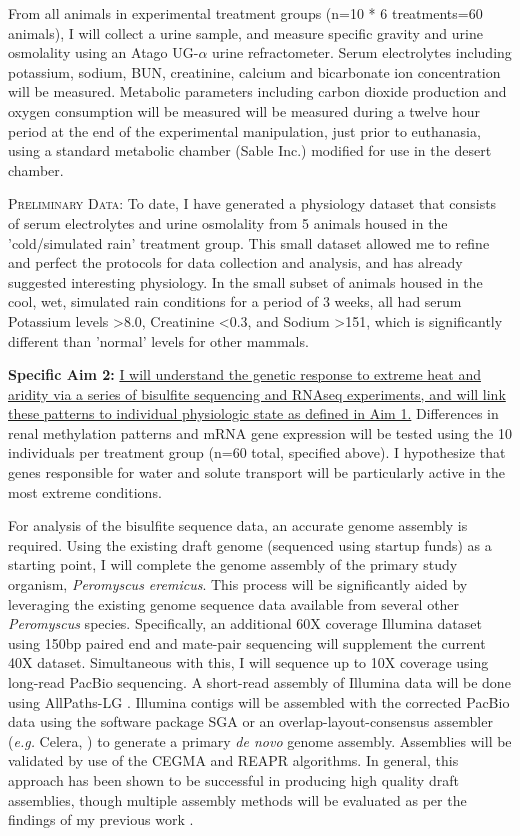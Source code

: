 \documentclass[11pt]{article}
\begin{document}
From all animals in experimental treatment groups (n=10 * 6 treatments=60 animals), I will collect a urine sample, and measure specific gravity and urine osmolality using an Atago UG-$\alpha$ urine refractometer. Serum electrolytes including potassium, sodium, BUN, creatinine, calcium and bicarbonate ion concentration will be measured. Metabolic parameters including carbon dioxide production and oxygen consumption will be measured will be measured during a twelve hour period at the end of the experimental manipulation, just prior to euthanasia, using a standard metabolic chamber (Sable Inc.) modified for use in the desert chamber. 

\textsc{{Preliminary Data:}} To date, I have generated a physiology dataset that consists of serum electrolytes and urine osmolality from 5 animals housed in the 'cold/simulated rain' treatment group. This small dataset allowed me to refine and perfect the protocols for data collection and analysis, and has already suggested interesting physiology. In the small subset of animals housed in the cool, wet, simulated rain conditions for a period of 3 weeks, all had serum Potassium levels \textgreater 8.0, Creatinine \textless 0.3, and Sodium \textgreater 151, which is significantly different than 'normal' levels for other mammals.  

\textbf{Specific Aim 2:} \ul{I will understand the genetic response to extreme heat and aridity via a series of bisulfite sequencing and RNAseq experiments, and will link these patterns to individual physiologic state as defined in Aim 1.} Differences in renal methylation patterns and mRNA gene expression will be tested using the 10 individuals per treatment group (n=60 total, specified above). I hypothesize that genes responsible for water and solute transport will be particularly active in the most extreme conditions.  

For analysis of the bisulfite sequence data, an accurate genome assembly is required. Using the existing draft genome (sequenced using startup funds) as a starting point, I will complete the genome assembly of the primary study organism, \textit{Peromyscus eremicus}. This process will be significantly aided by leveraging the existing genome sequence data available from several other \textit{Peromyscus} species. Specifically, an additional 60X coverage Illumina dataset using 150bp paired end and mate-pair sequencing will supplement the current 40X dataset. Simultaneous with this, I will sequence up to 10X coverage using long-read PacBio sequencing. A short-read assembly of Illumina data will be done using AllPaths-LG \citep{Maccallum:2009du}.  Illumina contigs will be assembled with the corrected PacBio data using the software package SGA \citep{Simpson:2012ef} or an overlap-layout-consensus assembler (\textit{e.g.} Celera, \cite{Miller:2008jx}) to generate a primary \textit{de novo} genome assembly. Assemblies will be validated by use of the CEGMA \citep{Parra:2007df} and REAPR \citep{Hunt:2013hj} algorithms. In general, this approach has been shown to be successful in producing high quality draft assemblies, though multiple assembly methods will be evaluated as per the findings of my previous work \citep{Bradnam:2013gx}.
\end{document}
